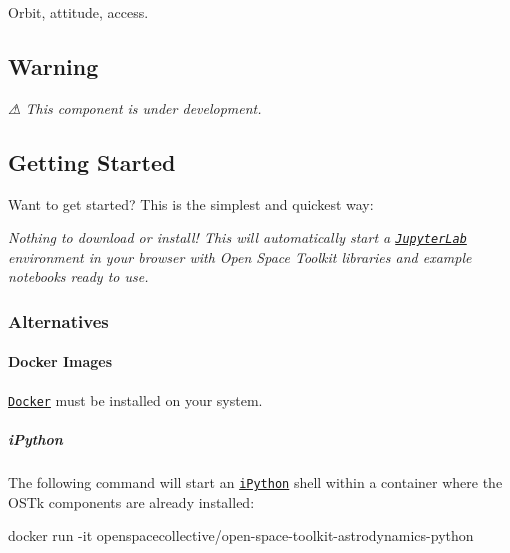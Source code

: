 \href{https://travis-ci.com/open-space-collective/open-space-toolkit-astrodynamics}{\tt } \href{https://codecov.io/gh/open-space-collective/open-space-toolkit-astrodynamics}{\tt } \href{https://open-space-collective.github.io/open-space-toolkit-astrodynamics}{\tt } \href{https://badge.fury.io/gh/open-space-collective%2Fopen-space-toolkit-astrodynamics}{\tt } \href{https://badge.fury.io/py/open-space-toolkit-astrodynamics}{\tt } \href{https://opensource.org/licenses/Apache-2.0}{\tt }

Orbit, attitude, access.



\subsection*{Warning}

{\itshape ⚠ This component is under development.}

\subsection*{Getting Started}

Want to get started? This is the simplest and quickest way\+:

\href{https://mybinder.org/v2/gh/open-space-collective/open-space-toolkit/master?urlpath=lab/tree/notebooks}{\tt }

{\itshape Nothing to download or install! This will automatically start a \href{https://jupyterlab.readthedocs.io/en/stable/}{\tt Jupyter\+Lab} environment in your browser with Open Space Toolkit libraries and example notebooks ready to use.}

\subsubsection*{Alternatives}

\paragraph*{Docker Images}

\href{https://www.docker.com/}{\tt Docker} must be installed on your system.

\subparagraph*{i\+Python}

The following command will start an \href{https://ipython.org/}{\tt i\+Python} shell within a container where the O\+S\+Tk components are already installed\+:


\begin{DoxyCode}
docker run -it openspacecollective/open-space-toolkit-astrodynamics-python
\end{DoxyCode}


